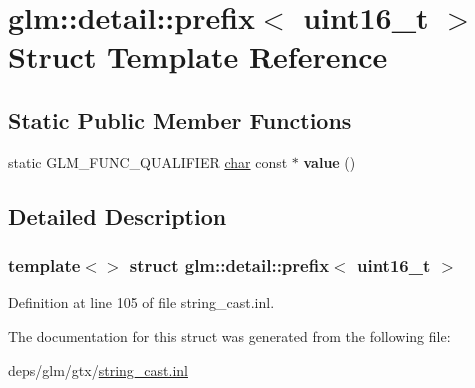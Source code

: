 \hypertarget{structglm_1_1detail_1_1prefix_3_01uint16__t_01_4}{}\section{glm\+:\+:detail\+:\+:prefix$<$ uint16\+\_\+t $>$ Struct Template Reference}
\label{structglm_1_1detail_1_1prefix_3_01uint16__t_01_4}
\subsection*{Static Public Member Functions}
\begin{DoxyCompactItemize}
\item 
\mbox{\label{structglm_1_1detail_1_1prefix_3_01uint16__t_01_4_a9546e8aaf707c3f0028c8da94f6c06da}} 
static G\+L\+M\+\_\+\+F\+U\+N\+C\+\_\+\+Q\+U\+A\+L\+I\+F\+I\+ER \hyperlink{classchar}{char} const  $\ast$ {\bfseries value} ()
\end{DoxyCompactItemize}


\subsection{Detailed Description}
\subsubsection*{template$<$$>$\newline
struct glm\+::detail\+::prefix$<$ uint16\+\_\+t $>$}



Definition at line 105 of file string\+\_\+cast.\+inl.



The documentation for this struct was generated from the following file\+:\begin{DoxyCompactItemize}
\item 
deps/glm/gtx/\hyperlink{string__cast_8inl}{string\+\_\+cast.\+inl}\end{DoxyCompactItemize}
